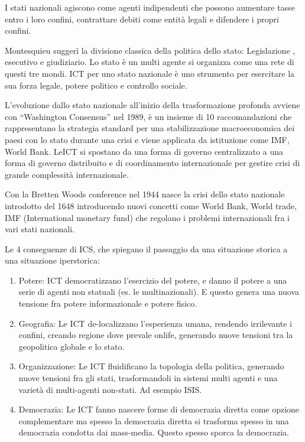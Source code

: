 \documentclass[]{article}
\begin{document}
I stati nazionali agiscono come agenti indipendenti che possono
aumentare tasse entro i loro confini, contrattare debiti come entità
legali e difendere i propri confini.

Montesquieu suggerì la divisione classica della politica dello stato:
Legislazione , esecutivo e giudiziario. Lo stato è un multi agente si
organizza come una rete di questi tre mondi. ICT per uno stato nazionale
è uno strumento per esercitare la sua forza legale, potere politico e
controllo sociale.

L'evoluzione dallo stato nazionale all'inizio della trasformazione
profonda avviene con ``Washington Consensus'' nel 1989, è un insieme di
10 raccomandazioni che rappresentano la strategia standard per una
stabilizzazione macroeconomica dei paesi con lo stato durante una crisi
e viene applicata da istituzione come IMF, World Bank. LeICT si spostano
da una forma di governo centralizzato a una forma di governo distribuito
e di coordinamento internazionale per gestire crisi di grande
complessità internazionale.

Con la Bretten Woods conference nel 1944 nasce la crisi dello stato
nazionale introdotto del 1648 introducendo nuovi concetti come World
Bank, World trade, IMF (International monetary fund) che regolano i
problemi internazionali fra i vari stati nazionali.

Le 4 conseguenze di ICS, che spiegano il passaggio da una situazione
storica a una situazione iperstorica:

\begin{enumerate}
	\def\labelenumi{\arabic{enumi})}
	 
	\item
	Potere: ICT democratizzano l'esercizio del potere, e danno il potere a
	una serie di agenti non statuali (es. le multinazionali). E questo
	genera una nuova tensione fra potere informazionale e potere fisico.
	\item
	Geografia: Le ICT de-localizzano l'esperienza umana, rendendo
	irrilevante i confini, creando regione dove prevale onlife, generando
	nuove tensioni tra la geopolitica globale e lo stato.
	\item
	Organizzazione: Le ICT fluidificano la topologia della politica,
	generando nuove tensioni fra gli stati, trasformandoli in sistemi
	multi agenti e una varietà di multi-agenti non-stati. Ad esempio ISIS.
	\item
	Democrazia: Le ICT fanno nascere forme di democrazia diretta come
	opzione complementare ma spesso la democrazia diretta si trasforma
	spesso in una democrazia condotta dai mass-media. Questo spesso sporca
	la democrazia.
\end{enumerate}
\end{document}
